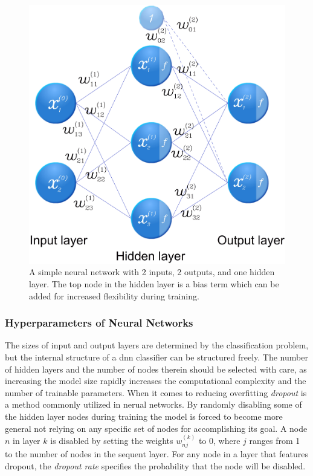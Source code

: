 \begin{figure}[h]
	\centering
	\includegraphics[scale=0.3]{figs_temp/network_graph.jpg}
	\caption{A simple neural network with 2 inputs, 2 outputs, and one hidden layer. The top node in the hidden layer is a bias term which can be added for increased flexibility during training.}
	\label{fig:ann}
\end{figure}

\subsubsection{Hyperparameters of Neural Networks}

The sizes of input and output layers are determined by the classification problem, but the internal structure of a \gls{dnn} classifier can be structured freely. The number of hidden layers and the number of nodes therein should be selected with care, as increasing the model size rapidly increases the computational complexity and the number of trainable parameters. When it comes to reducing overfitting \emph{dropout} is a method commonly utilized in nerual networks. By randomly disabling some of the hidden layer nodes during training the model is forced to become more general not relying on any specific set of nodes for accomplishing its goal. A node $n$ in layer $k$ is disabled by setting the weights $w^{(k)}_{nj}$ to 0, where $j$ ranges from 1 to the number of nodes in the sequent layer. For any node in a layer that features dropout, the \textit{dropout rate} specifies the probability that the node will be disabled.

